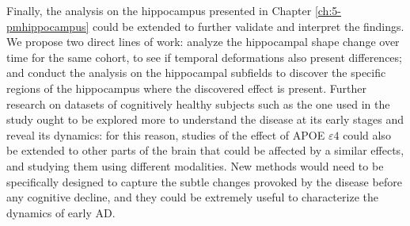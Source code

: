 Finally, the analysis on the hippocampus presented in Chapter \ref{ch:5-pmhippocampus} could be extended to further validate and interpret the findings. We propose two direct lines of work: analyze the hippocampal shape change over time for the same cohort, to see if temporal deformations also present differences; and conduct the analysis on the hippocampal subfields to discover the specific regions of the hippocampus where the discovered effect is present. Further research on datasets of cognitively healthy subjects such as the one used in the study ought to be explored more to understand the disease at its early stages and reveal its dynamics: for this reason, studies of the effect of APOE $\varepsilon4$ could also be extended to other parts of the brain that could be affected by a similar effects, and studying them using different modalities. New methods would need to be specifically designed to capture the subtle changes provoked by the disease before any cognitive decline, and they could be extremely useful to characterize the dynamics of early AD.